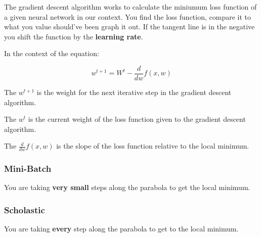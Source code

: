 The gradient descent algorithm works to calculate the miniumum loss function of a given neural network in our context. You find the loss function, compare it to what you value should've been graph it out. If the tangent line is in the negative you shift the function by the \textbf{learning rate}. 

In the context of the equation: 

\begin{equation}
w^{t+1} = W^t - \frac{d}{dw} f(x,w)
\end{equation}

The $w^{t+1}$ is the weight for the next iterative step in the gradient descent algorithm.

The $w^t$ is the current weight of the loss function given to the gradient descent algorithm. 

The $\frac{d}{dw} f(x,w)$ is the slope of the loss function relative to the local minimum. 

\subsubsection{Mini-Batch}
You are taking \textbf{very small} steps along the parabola to get the local minimum.
\subsubsection{Scholastic}
You are taking \textbf{every} step along the parabola to get to the local minimum. 
